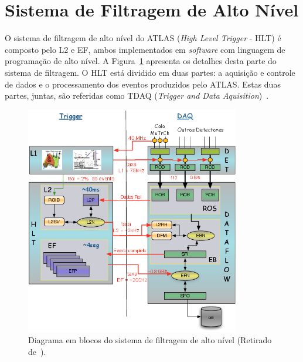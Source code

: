 \section{Sistema de Filtragem de Alto Nível}

O sistema de filtragem de alto nível do ATLAS (\emph{High Level Trigger} - HLT)
é composto pelo L2  e EF, ambos implementados em \emph{software} com linguagem
de programação de alto nível. A Figura~\ref{fig:tdaq_diagram} apresenta os
detalhes desta parte do sistema de filtragem. O HLT
está dividido em duas partes: a aquisição e controle de dados e o
processamento dos eventos produzidos pelo ATLAS. Estas duas partes, juntas, são
referidas como TDAQ (\emph{Trigger and Data Aquisition})~\cite{NEGRI2012,ref:TORRES}.

\begin{figure}[hbtp!]
\centering
    \includegraphics[height = 10cm]{images/tdaq_diagram.png}
    \caption[Diagrama em blocos do sistema de filtragem de alto nível.]{Diagrama
    em blocos do sistema de filtragem de alto nível (Retirado
    de~\cite{TORRES2009}).}
    \label{fig:tdaq_diagram}
\end{figure}


